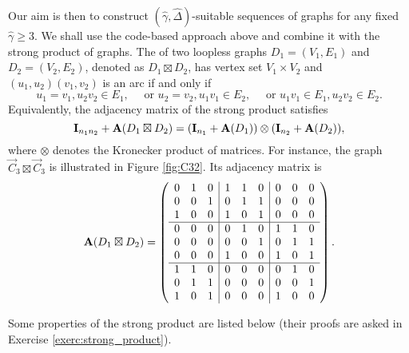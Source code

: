 \documentclass[a4paper, 11pt]{book}
\numberwithin{equation}{section}
\theoremstyle{plain}
\newcommand{\adjacency}{{\bf A}}
\renewcommand{\(}{\ldbrack}
\renewcommand{\)}{\rdbrack}
\newcommand{\BF}[1]{{\bf\boldmath{#1}\unboldmath}}
\begin{document}
Our aim is then to construct $(\hat{\gamma}, \hat{\Delta})$-suitable sequences of graphs for any fixed $\hat{\gamma} \ge 3$. We shall use the code-based approach above and combine it with the strong product of graphs. The \BF{strong product} of two loopless graphs $D_1 = (V_1, E_1)$ and $D_2 = (V_2, E_2)$, denoted as $D_1 \boxtimes D_2$, has vertex set $V_1 \times V_2$ and $(u_1, u_2) (v_1, v_2)$ is an arc if and only if
\[
	u_1 = v_1, u_2v_2 \in E_1, \quad \text{ or } u_2 = v_2, u_1v_1 \in E_2, \quad \text{ or } u_1v_1 \in E_1, u_2v_2 \in E_2.
\]
Equivalently, the adjacency matrix of the strong product satisfies
\[
	{\bf I}_{n_1n_2} + \adjacency(D_1 \boxtimes D_2) = ({\bf I}_{n_1} + \adjacency(D_1)) \otimes ({\bf I}_{n_2} + \adjacency(D_2)),
\]
where $\otimes$ denotes the Kronecker product of matrices. For instance, the graph $\vec{C}_3 \boxtimes \vec{C}_3$ is illustrated in Figure \ref{fig:C32}. Its adjacency matrix is
\[
	\adjacency(D_1 \boxtimes D_2) = \left( \begin{array}{ccc|ccc|ccc}
	0 & 1 & 0 & 1 & 1 & 0 & 0 & 0 & 0\\
	0 & 0 & 1 & 0 & 1 & 1 & 0 & 0 & 0\\
	1 & 0 & 0 & 1 & 0 & 1 & 0 & 0 & 0\\
	\hline
	0 & 0 & 0 & 0 & 1 & 0 & 1 & 1 & 0\\
	0 & 0 & 0 & 0 & 0 & 1 & 0 & 1 & 1\\
	0 & 0 & 0 & 1 & 0 & 0 & 1 & 0 & 1\\
	\hline
	1 & 1 & 0 & 0 & 0 & 0 & 0 & 1 & 0\\
	0 & 1 & 1 & 0 & 0 & 0 & 0 & 0 & 1\\
	1 & 0 & 1 & 0 & 0 & 0 & 1 & 0 & 0
	\end{array} \right).
\]

Some properties of the strong product are listed below (their proofs are asked in Exercise \ref{exerc:strong_product}). 
\end{document}
